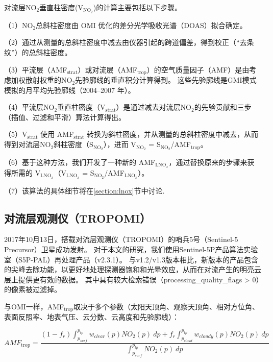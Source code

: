 对流层NO$_2$垂直柱密度(V$_{\textrm{NO$_2$}}$)的计算主要包括以下步骤。

（1）NO$_2$总斜柱密度由 OMI 优化的差分光学吸收光谱（DOAS）拟合确定。

（2）通过从测量的总斜柱密度中减去由仪器引起的跨道偏差，得到校正（“去条纹”）的总斜柱密度。

（3）平流层（AMF$_{\textrm{strat}}$）或对流层（AMF$_{\textrm{trop}}$）的空气质量因子（AMF）是由考虑加权散射权重的NO$_2$先验廓线的垂直积分计算得到。
这些先验廓线是GMI模式模拟的月平均先验廓线（2004--2007 年）。

（4）平流层NO$_2$垂直柱密度（V$_{\textrm{strat}}$）是通过减去对流层NO$_2$的先验贡献和三步（插值、过滤和平滑）算法计算得出\citep{Bucsela.2013}。

（5）V$_{\textrm{strat}}$ 使用 AMF$_{\textrm{strat}}$ 转换为斜柱密度，并从测量的总斜柱密度中减去，从而得到对流层NO$_2$斜柱密度（S$_{\textrm{NO$_2$}}$），进而 V$_{\textrm{NO$_2$}}$ = S$_{\textrm{NO$_2$}}$/AMF$_{\textrm{trop}}$。

（6）基于这种方法，我们开发了一种新的 AMF$_\textrm{LNO$_x$}$，通过替换原来的步骤来获得所需的 V$_\textrm{LNO$_x$}$（V$_\textrm{LNO$_x$}$ = S$_{\textrm{NO$_2$}}$/AMF$_\textrm{LNO$_x$}$）。

（7）该算法的具体细节将在\ref{section:lnox}节中讨论.

\subsection{对流层观测仪（TROPOMI）}

2017年10月13日，搭载对流层观测仪（TROPOMI）的哨兵5号（Sentinel-5 Precursor）卫星成功发射\citep{Veefkind.2012}。
对于本文的研究，我们使用Sentinel-5P产品算法实验室（S5P-PAL）再处理产品（v2.3.1）。
与v1.2/v1.3版本相比，新版本的产品包含的尖峰去除功能，以更好地处理探测器饱和和光晕效应，从而在对流产生的明亮云层上提供更有效的数据\citep{Ludewig.2020,VanGeffen.2022}。
其中具有较大检索错误（processing\_quality\_flags > 0）的像素被过滤掉。

与OMI一样，AMF$_{\textrm{trop}}$取决于多个参数（太阳天顶角、观察天顶角、相对方位角、表面反照率、地表气压、云分数、云高度和先验廓线）：

\begin{equation} \label{eq:AMF_NO2}
AMF_{\textrm{trop}} = \frac{(1-f_r) \int_{p_{surf}}^{p_{tp}} w_{clear}(p) NO_2(p) \: dp + f_r \int_{p_{cloud}}^{p_{tp}} w_{cloudy}(p) NO_2(p) \: dp}{\int_{p_{surf}}^{p_{tp}} NO_2(p) \: dp}
\end{equation}

